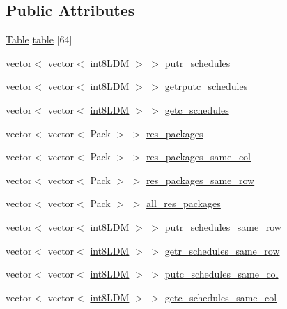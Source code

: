 \subsection*{Public Attributes}
\begin{DoxyCompactItemize}
\item 
\mbox{\hyperlink{structTable}{Table}} \mbox{\hyperlink{classRlmpiInitializer_a23796d30caf16cdf78e08ebe5a708588}{table}} \mbox{[}64\mbox{]}
\item 
vector$<$ vector$<$ \mbox{\hyperlink{include_2RlmpiShared_8h_a69782ffde89d45e86308f10afedf08a6}{int8\+L\+DM}} $>$ $>$ \mbox{\hyperlink{classRlmpiInitializer_ad74dbbbb2c84f6e5fa79a303f5c89e66}{putr\+\_\+schedules}}
\item 
vector$<$ vector$<$ \mbox{\hyperlink{include_2RlmpiShared_8h_a69782ffde89d45e86308f10afedf08a6}{int8\+L\+DM}} $>$ $>$ \mbox{\hyperlink{classRlmpiInitializer_a0363a64d44e61840473b741f25001153}{getrputc\+\_\+schedules}}
\item 
vector$<$ vector$<$ \mbox{\hyperlink{include_2RlmpiShared_8h_a69782ffde89d45e86308f10afedf08a6}{int8\+L\+DM}} $>$ $>$ \mbox{\hyperlink{classRlmpiInitializer_a36e64b283b967a7d86864f85d558abb9}{getc\+\_\+schedules}}
\item 
vector$<$ vector$<$ Pack $>$ $>$ \mbox{\hyperlink{classRlmpiInitializer_a991369e5c4c3bbf824ea8e1e92814e31}{res\+\_\+packages}}
\item 
vector$<$ vector$<$ Pack $>$ $>$ \mbox{\hyperlink{classRlmpiInitializer_ab9328cb2f4b0b3a5c9c0f5256a13a0ef}{res\+\_\+packages\+\_\+same\+\_\+col}}
\item 
vector$<$ vector$<$ Pack $>$ $>$ \mbox{\hyperlink{classRlmpiInitializer_a45d4b33db1e5dfa60cedd544e28cf9ad}{res\+\_\+packages\+\_\+same\+\_\+row}}
\item 
vector$<$ vector$<$ Pack $>$ $>$ \mbox{\hyperlink{classRlmpiInitializer_a3ffc05749f6745743941f7f288244d63}{all\+\_\+res\+\_\+packages}}
\item 
vector$<$ vector$<$ \mbox{\hyperlink{include_2RlmpiShared_8h_a69782ffde89d45e86308f10afedf08a6}{int8\+L\+DM}} $>$ $>$ \mbox{\hyperlink{classRlmpiInitializer_afa8bea8bfed25052731e7c919ce92068}{putr\+\_\+schedules\+\_\+same\+\_\+row}}
\item 
vector$<$ vector$<$ \mbox{\hyperlink{include_2RlmpiShared_8h_a69782ffde89d45e86308f10afedf08a6}{int8\+L\+DM}} $>$ $>$ \mbox{\hyperlink{classRlmpiInitializer_abc07b9a75ce962623dc3963f9ee7fcc9}{getr\+\_\+schedules\+\_\+same\+\_\+row}}
\item 
vector$<$ vector$<$ \mbox{\hyperlink{include_2RlmpiShared_8h_a69782ffde89d45e86308f10afedf08a6}{int8\+L\+DM}} $>$ $>$ \mbox{\hyperlink{classRlmpiInitializer_a8ebf26be4fb489d2ef85ba353c42f626}{putc\+\_\+schedules\+\_\+same\+\_\+col}}
\item 
vector$<$ vector$<$ \mbox{\hyperlink{include_2RlmpiShared_8h_a69782ffde89d45e86308f10afedf08a6}{int8\+L\+DM}} $>$ $>$ \mbox{\hyperlink{classRlmpiInitializer_a77861590565339a9ad5ce4331e281061}{getc\+\_\+schedules\+\_\+same\+\_\+col}}
\end{DoxyCompactItemize}

